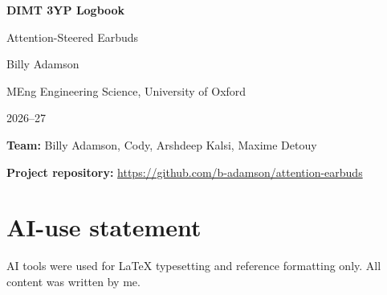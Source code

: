 \documentclass[11pt,a4paper]{article}
\begin{document}
\begin{titlepage}
  \centering
  \vspace*{3cm}
  {\Huge\bfseries DIMT 3YP Logbook\par}
  \vspace{0.5cm}
  {\Large Attention-Steered Earbuds\par}
  \vspace{2cm}
  {\Large Billy Adamson\par}
  \vspace{0.5cm}
  MEng Engineering Science, University of Oxford\par
  2026--27\par
  \vspace{1.5cm}
  \textbf{Team:} Billy Adamson, Cody, Arshdeep Kalsi, Maxime Detouy\par
  \vspace{0.5cm}
  \textbf{Project repository:} \url{https://github.com/b-adamson/attention-earbuds}\par
\end{titlepage}

\section*{AI-use statement}
AI tools were used for LaTeX typesetting and reference formatting only. All content was written by me.

\tableofcontents
\clearpage




\clearpage
\printbibliography[heading=bibintoc]
\end{document}
